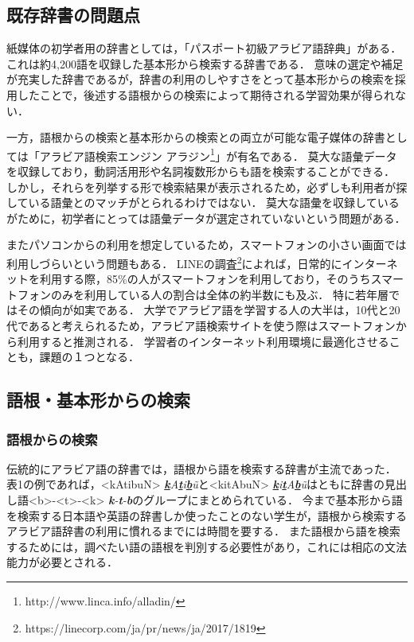 \documentclass[technicalreport]{ieicej}
\begin{document}
\subsection{既存辞書の問題点}
紙媒体の初学者用の辞書としては，「パスポート初級アラビア語辞典」\cite{honda1997}がある．
これは約4,200語を収録した基本形から検索する辞書である．
意味の選定や補足が充実した辞書であるが，辞書の利用のしやすさをとって基本形からの検索を採用したことで，後述する語根からの検索によって期待される学習効果が得られない．

一方，語根からの検索と基本形からの検索との両立が可能な電子媒体の辞書としては「アラビア語検索エンジン アラジン\footnote{http://www.linca.info/alladin/}」が有名である．
莫大な語彙データを収録しており，動詞活用形や名詞複数形からも語を検索することができる．
しかし，それらを列挙する形で検索結果が表示されるため，必ずしも利用者が探している語彙とのマッチがとられるわけではない．
莫大な語彙を収録しているがために，初学者にとっては語彙データが選定されていないという問題がある．

またパソコンからの利用を想定しているため，スマートフォンの小さい画面では利用しづらいという問題もある．
LINEの調査\footnote{https://linecorp.com/ja/pr/news/ja/2017/1819}によれば，日常的にインターネットを利用する際，85\%の人がスマートフォンを利用しており，そのうちスマートフォンのみを利用している人の割合は全体の約半数にも及ぶ．
特に若年層ではその傾向が如実である．
大学でアラビア語を学習する人の大半は，10代と20代であると考えられるため，アラビア語検索サイトを使う際はスマートフォンから利用すると推測される．
学習者のインターネット利用環境に最適化させることも，課題の１つとなる．

\subsection{語根・基本形からの検索}
\subsubsection{語根からの検索}
伝統的にアラビア語の辞書では，語根から語を検索する辞書が主流であった．
表1の例であれば，<kAtibuN> \textit{\underline{\textbf{k}}A\underline{\textbf{t}}i\underline{\textbf{b}}\~u}と<kitAbuN> \textit{\underline{\textbf{k}}i\underline{\textbf{t}}A\underline{\textbf{b}}\~u}はともに辞書の見出し語<b>-<t>-<k> \textit{\textbf{k}-\textbf{t}-\textbf{b}}のグループにまとめられている．
今まで基本形から語を検索する日本語や英語の辞書しか使ったことのない学生が，語根から検索するアラビア語辞書の利用に慣れるまでには時間を要する．
また語根から語を検索するためには，調べたい語の語根を判別する必要性があり，これには相応の文法能力が必要とされる．
\end{document}
